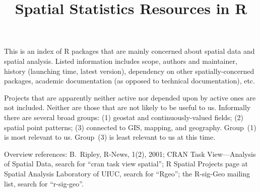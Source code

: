 \documentclass[12pt]{article}
\begin{document}
\title{Spatial Statistics Resources in R}
\maketitle

This is an index of R packages that are mainly concerned about
spatial data and spatial analysis.
Listed information includes
scope, authors and maintainer,
history (launching time, latest version),
dependency on other spatially-concerned packages,
academic documentation (as opposed to technical documentation),
etc.

Projects that are apparently neither active nor depended upon by active
ones are not included.
Neither are those that are not likely to be useful to us.
Informally there are several broad groups:
(1) geostat and continuously-valued fields;
(2) spatial point patterns;
(3) connected to GIS, mapping, and geography.
Group~(1) is most relevant to us.
Group~(3) is least relevant to us at this time.

Overview references:
B.\ Ripley, R-News, 1(2), 2001;
CRAN Task View---Analysis of Spatial Data,
search for ``cran task view spatial'';
R Spatial Projects page at Spatial Analysis Laboratory of UIUC,
search for ``Rgeo'';
the R-sig-Geo mailing list,
search for ``r-sig-geo''.
\end{document}
